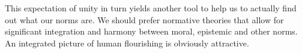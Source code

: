 This expectation of unity in turn yields another tool to help us to actually find out what our norms are. We should prefer normative theories
that allow for significant integration and harmony between moral, epistemic and other norms. An integrated picture of human flourishing
is obviously attractive.




